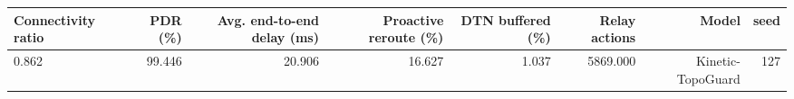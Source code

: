 \begin{tabular}{lrrrrrrr}
\toprule
Connectivity ratio & PDR (\%) & Avg. end-to-end delay (ms) & Proactive reroute (\%) & DTN buffered (\%) & Relay actions & Model & seed \\
\midrule
0.862 & 99.446 & 20.906 & 16.627 & 1.037 & 5869.000 & Kinetic-TopoGuard & 127 \\
\bottomrule
\end{tabular}